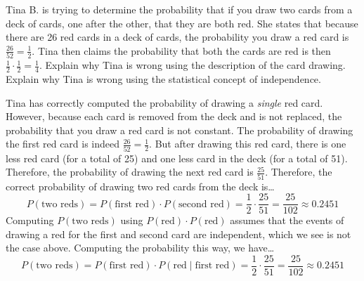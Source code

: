 \documentclass[11pt,letterpaper]{article}
\begin{document}
\newpage



 Tina B. is trying to determine the probability that if you draw two cards from a deck of cards, one after the other, that they are both red. She states that because there are 26 red cards in a deck of cards, the probability you draw a red card is $\frac{26}{52}= \frac{1}{2}$. Tina then claims the probability that both the cards are red is then $\frac{1}{2} \cdot \frac{1}{2}= \frac{1}{4}$. Explain why Tina is wrong using the description of the card drawing. Explain why Tina is wrong using the statistical concept of independence. \pspace

\sol Tina has correctly computed the probability of drawing a \textit{single} red card. However, because each card is removed from the deck and is not replaced, the probability that you draw a red card is not constant. The probability of drawing the first red card is indeed $\frac{26}{52}= \frac{1}{2}$. But after drawing this red card, there is one less red card (for a total of 25) and one less card in the deck (for a total of 51). Therefore, the probability of drawing the next red card is $\frac{25}{51}$. Therefore, the correct probability of drawing two red cards from the deck is\dots
	\[
	P(\text{two reds})= P(\text{first red}) \cdot P(\text{second red})= \dfrac{1}{2} \cdot \dfrac{25}{51}= \dfrac{25}{102} \approx 0.2451
	\]
Computing $P(\text{two reds})$ using $P(\text{red}) \cdot P(\text{red})$ assumes that the events of drawing a red for the first and second card are independent, which we see is not the case above. Computing the probability this way, we have\dots
	\[
	P(\text{two reds})= P(\text{first red}) \cdot P(\text{red} \;|\; \text{first red})= \dfrac{1}{2} \cdot \dfrac{25}{51}= \dfrac{25}{102} \approx 0.2451
	\]
\end{document}
